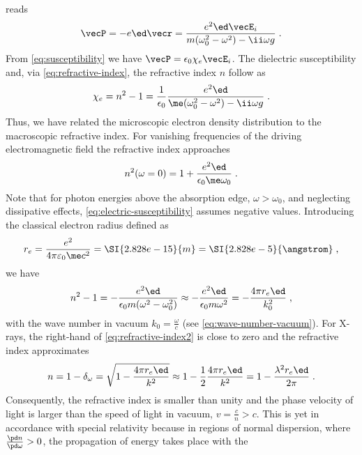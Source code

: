 \documentclass[
twoside,
openright,
titlepage,
numbers=noenddot,
headinclude,
fleqn,
a4paper,
footinclude=true,
cleardoublepage=empty,
abstractoff,
BCOR=5mm,
paper=a4,
fontsize=11pt,
british,ngerman,american,
]{scrreprt}
\begin{document}
reads
\begin{equation}
  \label{eq:P}
  \vecP = -e\ed\vecr = 
  \frac{e^2\ed\vecE_i}{m(\omega_0^2-\omega^2)-\ii\omega g} \;.
\end{equation}
From \cref{eq:susceptibility} we have $\vecP=\epsilon_0\chi_e\vecE_i$.
The dielectric susceptibility and, via \cref{eq:refractive-index}, the
refractive index $n$ follow as
\begin{equation}
  \label{eq:electric-susceptibility}
  \chi_e = n^2 - 1 
  = \frac{1}{\epsilon_0}\frac{e^2\ed}
  {\me(\omega_0^2-\omega^2)-\ii\omega g} \;.
\end{equation}
Thus, we have related the microscopic electron density distribution to
the macroscopic refractive index.  For vanishing frequencies of the
driving electromagnetic field the refractive index approaches
\begin{equation}
  \label{eq:zero-frequency}
  n^2(\omega=0)=1+\frac{e^2\ed}{\epsilon_0 \me\omega_0} \;.
\end{equation}
Note that for photon energies above the absorption edge,
$\omega>\omega_0$, and neglecting dissipative effects,
\cref{eq:electric-susceptibility} assumes negative values.
Introducing the classical electron radius defined as
\begin{equation}
  \label{eq:classical-electron-radius}
  r_e=\frac{e^2}{4\pi\varepsilon_0\me c^2}
  =\SI{2.828e-15}{m} = \SI{2.828e-5}{\angstrom} \;,
\end{equation}
we have
\begin{equation}
  \label{eq:refractive-index2}
  n^2 - 1  = - \frac{e^2\ed}{\epsilon_0 m(\omega^2-\omega_0^2)} 
  \approx  - \frac{e^2\ed}{\epsilon_0 m\omega^2} 
  = - \frac{4\pi r_e\ed}{k_0^2}  \;,
\end{equation}
with the wave number in vacuum $k_0=\frac{\omega}{c}$ (see
\cref{eq:wave-number-vacuum}).  For X-rays, the right-hand of
\cref{eq:refractive-index2} is close to zero and the refractive index
approximates
\begin{equation}
  \label{eq:refractive-index3}
  n  = 1 - \delta_\omega 
  = \sqrt{1- \frac{4\pi r_e \ed}{k^2}} 
  \approx 1 - \frac12\frac{4\pi r_e \ed}{k^2}
  = 1 - \frac{\lambda^2 r_e \ed}{2\pi} \;.
\end{equation}
Consequently, the refractive index is smaller than unity and the phase
velocity of light is larger than the speed of light in vacuum,
$v=\frac{c}{n}>c$.  This is yet in accordance with special relativity
because in regions of normal dispersion, where $\frac{\pd
  n}{\pd\omega}>0$, the propagation of energy takes place with the
\end{document}
